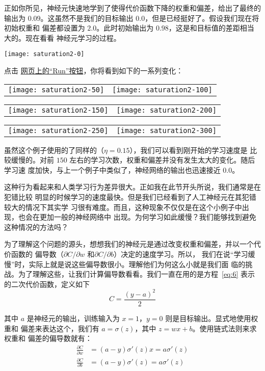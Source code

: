 正如你所见，神经元快速地学到了使得代价函数下降的权重和偏差，给出了最终的输出为
$0.09$。这虽然不是我们的目标输出 $0.0$，但是已经挺好了。假设我们现在将初始权重和
偏差都设置为 $2.0$。此时初始输出为 $0.98$，这是和目标值的差距相当大的。现在看看
神经元学习的过程。
\begin{center}
  \texttt{[image: saturation2-0]}
\end{center}
点击%
\href{http://neuralnetworksanddeeplearning.com/chap3.html#the_cross-entropy_cost_function}{
  网页上的``Run''按钮}，你将看到如下的一系列变化：
  \begin{center}
    \begin{tabular}{ll}
      \texttt{[image: saturation2-50]} & \texttt{[image: saturation2-100]}\\
    \end{tabular}
    \begin{tabular}{ll}
      \texttt{[image: saturation2-150]} & \texttt{[image: saturation2-200]}\\
    \end{tabular}
    \begin{tabular}{ll}
      \texttt{[image: saturation2-250]} & \texttt{[image: saturation2-300]}
    \end{tabular}
  \end{center}

虽然这个例子使用的了同样的\learningrate{}（$\eta=0.15$），我们可以看到刚开始的学习速度是
比较缓慢的。对前 $150$ 左右的学习次数，权重和偏差并没有发生太大的变化。随后学习速
度加快，与上一个例子中类似了，神经网络的输出也迅速接近 $0.0$。

这种行为看起来和人类学习行为差异很大。正如我在此节开头所说，我们通常是在犯错比较
明显的时候学习的速度最快。但是我们已经看到了人工神经元在其犯错较大的情况下其实学
习很有难度。而且，这种现象不仅仅是在这个小例子中出现，也会在更加一般的神经网络中
出现。为何学习如此缓慢？我们能够找到避免这种情况的方法吗？

为了理解这个问题的源头，想想我们的神经元是通过改变权重和偏差，并以一个代价函数的
偏导数（$\partial C/\partial w$ 和$\partial C/\partial b$）决定的速度学习。所以，
我们在说``学习缓慢''时，实际上就是说这些偏导数很小。理解他们为何这么小就是我们面
临的挑战。为了理解这些，让我们计算偏导数看看。我们一直在用的是方程~\eqref{eq:6}
表示的二次代价函数，定义如下
\begin{equation}
  C = \frac{(y-a)^2}{2}
\label{eq:54}\tag{54}
\end{equation}

其中 $a$ 是神经元的输出，训练输入为 $x=1$，$y=0$ 则是目标输出。显式地使用权重和
偏差来表达这个，我们有 $a = \sigma(z)$，其中 $z = wx+b$。使用链式法则来求权重和
偏差的偏导数就有：
\begin{align}
  \frac{\partial C}{\partial w} &= (a-y)\sigma'(z) x = a \sigma'(z)\label{eq:55}\tag{55}\\
  \frac{\partial C}{\partial b} &= (a-y)\sigma'(z) = a \sigma'(z)\label{eq:56}\tag{56}
\end{align}

